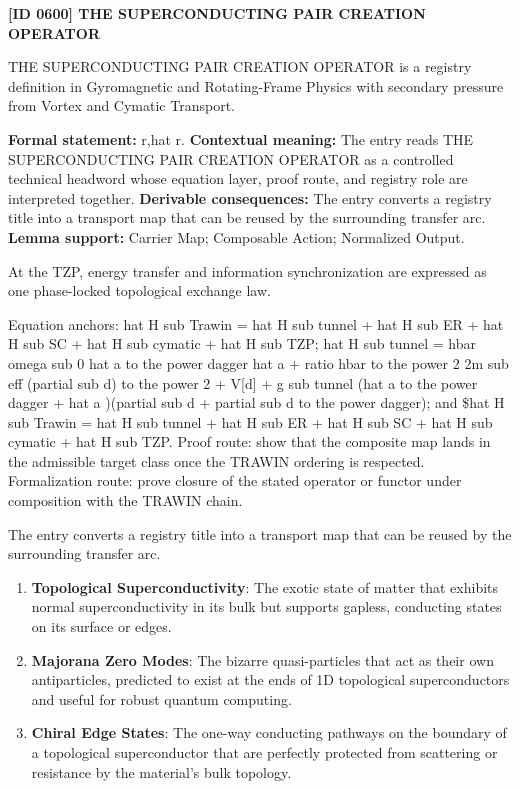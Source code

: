 \clearpage
\noindent\textbf{[ID 0600] THE SUPERCONDUCTING PAIR CREATION OPERATOR}\par
\vspace{0.35em}
\begingroup\small
{}
THE SUPERCONDUCTING PAIR CREATION OPERATOR is a registry definition in Gyromagnetic and Rotating-Frame Physics with secondary pressure from Vortex and Cymatic Transport.

\begingroup\footnotesize\setlength{\emergencystretch}{3em}\sloppy
\textbf{Formal statement:} r,hat r. \textbf{Contextual meaning:} The entry reads THE SUPERCONDUCTING PAIR CREATION OPERATOR as a controlled technical headword whose equation layer, proof route, and registry role are interpreted together. \textbf{Derivable consequences:} The entry converts a registry title into a transport map that can be reused by the surrounding transfer arc. \textbf{Lemma support:} Carrier Map; Composable Action; Normalized Output.\par
\endgroup

At the TZP, energy transfer and information synchronization are expressed as one phase-locked topological exchange law.

Equation anchors: hat H sub Trawin = hat H sub tunnel + hat H sub ER + hat H sub SC + hat H sub cymatic + hat H sub TZP; hat H sub tunnel = hbar omega sub 0 hat a to the power dagger hat a + ratio hbar to the power 2 2m sub eff (partial sub d) to the power 2 + V[d] + g sub tunnel (hat a to the power dagger + hat a )(partial sub d + partial sub d to the power dagger); and \$hat H sub Trawin = hat H sub tunnel + hat H sub ER + hat H sub SC + hat H sub cymatic + hat H sub TZP. Proof route: show that the composite map lands in the admissible target class once the TRAWIN ordering is respected. Formalization route: prove closure of the stated operator or functor under composition with the TRAWIN chain.

The entry converts a registry title into a transport map that can be reused by the surrounding transfer arc.
\endgroup

\begin{enumerate}[leftmargin=1.6em,itemsep=6pt,topsep=4pt]
\item \textbf{Topological Superconductivity}: The exotic state of matter that exhibits normal superconductivity in its bulk but supports gapless, conducting states on its surface or edges.
\item \textbf{Majorana Zero Modes}: The bizarre quasi-particles that act as their own antiparticles, predicted to exist at the ends of 1D topological superconductors and useful for robust quantum computing.
\item \textbf{Chiral Edge States}: The one-way conducting pathways on the boundary of a topological superconductor that are perfectly protected from scattering or resistance by the material's bulk topology.
\end{enumerate}

